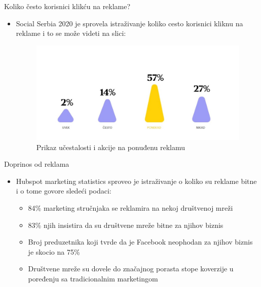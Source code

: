 \documentclass{beamer}
\begin{document}
	
	\begin{frame}{Koliko često korisnici klikću na reklame?}
		
		\begin{itemize}
			\item Social Serbia 2020 je sprovela istraživanje koliko cesto korisnici kliknu na reklame i to se može videti na slici:
			\begin{figure}[h!]
				\begin{center}
					\includegraphics[scale=0.40]{klik_na_reklamu.jpg}
				\end{center}
				\caption{Prikaz učestalosti i akcije na ponuđenu reklamu}
				\label{fig:klik_na_reklamu}
			\end{figure}
		\end{itemize}
		
	\end{frame}
	
	\begin{frame}{Doprinos od reklama}
		\begin{itemize}
			\item Hubspot marketing statistics sproveo je istraživanje o koliko su reklame bitne i o tome govore sledeći podaci:
			\begin{itemize}
		    	\item 84\% marketing stručnjaka se reklamira na nekoj društvenoj mreži
		    	\item 83\% njih insistira da su društvene mreže bitne za njihov biznis
			    \item Broj preduzetnika koji tvrde da je Facebook neophodan za njihov biznis je skocio na 75\%
			    \item Društvene mreže su dovele do značajnog porasta stope koverzije u poređenju sa tradicionalnim marketingom 
		    \end{itemize}
		\end{itemize}
	\end{frame}
	
\end{document}

